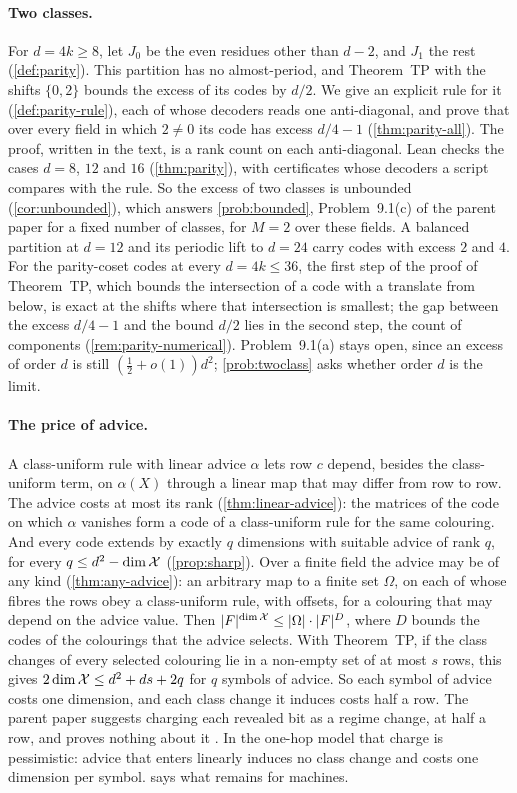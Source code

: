 \paragraph{Two classes.} For $d=4k\ge8$, let $J_0$ be the even residues other than $d-2$, and $J_1$ the rest
(\cref{def:parity}). This partition has no almost-period, and Theorem~TP with the shifts $\{0,2\}$ bounds the excess of
its codes by $d/2$. We give an explicit rule for it (\cref{def:parity-rule}), each of whose decoders reads one
anti-diagonal, and prove that over every field in which $2\ne0$ its code has excess $d/4-1$ (\cref{thm:parity-all}).
The proof, written in the text, is a rank count on each anti-diagonal. Lean checks the cases $d=8$, $12$ and $16$
(\cref{thm:parity}), with certificates whose decoders a script compares with the rule. So the excess of two classes is
unbounded (\cref{cor:unbounded}), which answers \cref{prob:bounded}, Problem~9.1(c) of the parent paper for a fixed
number of classes, for $M=2$ over these fields. A balanced partition at $d=12$ and its periodic lift to $d=24$ carry
codes with excess $2$ and $4$. For the parity-coset codes at every $d=4k\le36$, the first step of the proof of
Theorem~TP, which bounds the intersection of a code with a translate from below, is exact at the shifts where that
intersection is smallest; the gap between the excess $d/4-1$ and the bound $d/2$ lies in the second step, the count of
components (\cref{rem:parity-numerical}). Problem~9.1(a) stays open, since an excess of order $d$ is still
$(\frac12+o(1))d^2$; \cref{prob:twoclass} asks whether order $d$ is the limit.

\paragraph{The price of advice.} A class-uniform rule with linear advice $\alpha$ lets row $c$ depend, besides the
class-uniform term, on $\alpha(X)$ through a linear map that may differ from row to row. The advice costs at most its
rank (\cref{thm:linear-advice}): the matrices of the code on which $\alpha$ vanishes form a code of a class-uniform
rule for the same colouring. And every code extends by exactly $q$ dimensions with suitable advice of rank $q$, for
every $q\le d^2-\dim\mathcal{X}$ (\cref{prop:sharp}). Over a finite field the advice may be of any kind (\cref{thm:any-advice}):
an arbitrary map to a finite set $\Omega$, on each of whose fibres the rows obey a class-uniform rule, with offsets, for
a colouring that may depend on the advice value. Then $\lvert F \rvert^{\dim\mathcal{X}}\le\lvert \Omega \rvert\cdot\lvert F \rvert^{D}$, where $D$
bounds the codes of the colourings that the advice selects. With Theorem~TP, if the class changes of every selected
colouring lie in a non-empty set of at most $s$ rows, this gives $2\dim\mathcal{X}\le d^2+ds+2q$ for $q$ symbols of advice. So
each symbol of advice costs one dimension, and each class change it induces costs half a row. The parent paper suggests
charging each revealed bit as a regime change, at half a row, and proves nothing about it
\cite[Section~7.4]{SeventeenthPaper2026}. In the one-hop model that charge is pessimistic: advice that enters linearly
induces no class change and costs one dimension per symbol.  says what remains for machines.


